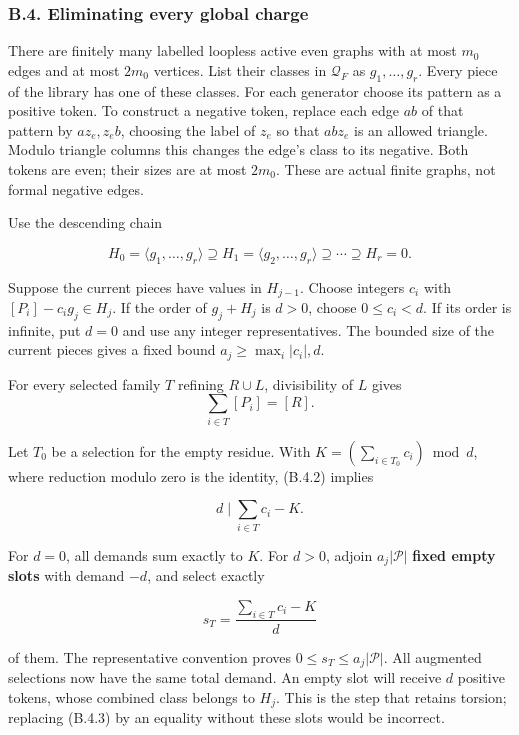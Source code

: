 \documentclass[english,11pt,a4paper]{article}
\begin{document}
\subsubsection{B.4. Eliminating every global charge}\label{b.4.-eliminating-every-global-charge}

There are finitely many labelled loopless active even graphs with at most \(m_0\) edges and at most \(2m_0\) vertices. List their classes in \(\mathcal Q_F\) as \(g_1,\ldots,g_r\). Every piece of the library has one of these classes. For each generator choose its pattern as a positive token. To construct a negative token, replace each edge \(ab\) of that pattern by \(az_e,z_eb\), choosing the label of \(z_e\) so that \(abz_e\) is an allowed triangle. Modulo triangle columns this changes the edge's class to its negative. Both tokens are even; their sizes are at most \(2m_0\). These are actual finite graphs, not formal negative edges.

Use the descending chain

\[H_0=\langle g_1,\ldots,g_r\rangle\supseteq H_1
=\langle g_2,\ldots,g_r\rangle\supseteq\cdots\supseteq H_r=0.
\tag{B.4.1}\]

Suppose the current pieces have values in \(H_{j-1}\). Choose integers \(c_i\) with \([P_i]-c_ig_j\in H_j\). If the order of \(g_j+H_j\) is \(d>0\), choose \(0\le c_i<d\). If its order is infinite, put \(d=0\) and use any integer representatives. The bounded size of the current pieces gives a fixed bound \(a_j\ge\max_i|c_i|,d\).

For every selected family \(T\) refining \(R\cup L\), divisibility of \(L\) gives \[\sum_{i\in T}[P_i]=[R].
\tag{B.4.2}\]

Let \(T_0\) be a selection for the empty residue. With \(K=(\sum_{i\in T_0}c_i)\bmod d\), where reduction modulo zero is the identity, (B.4.2) implies

\[d\mid \sum_{i\in T}c_i-K.
\tag{B.4.3}\]

For \(d=0\), all demands sum exactly to \(K\). For \(d>0\), adjoin \(a_j|\mathcal P|\) \textbf{fixed empty slots} with demand \(-d\), and select exactly

\[s_T=\frac{\sum_{i\in T}c_i-K}{d}\]

of them. The representative convention proves \(0\le s_T\le a_j|\mathcal P|\). All augmented selections now have the same total demand. An empty slot will receive \(d\) positive tokens, whose combined class belongs to \(H_j\). This is the step that retains torsion; replacing (B.4.3) by an equality without these slots would be incorrect.
\end{document}
